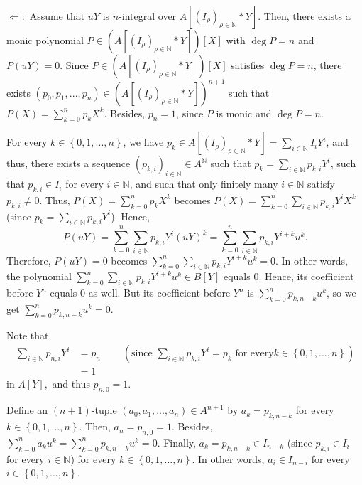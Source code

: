 \documentclass[12pt,final,notitlepage,onecolumn]{article}%
\begin{document}
$\Longleftarrow:$ Assume that $uY$ is $n$-integral over $A\left[  \left(
I_{\rho}\right)  _{\rho\in\mathbb{N}}\ast Y\right]  $. Then, there exists a
monic polynomial $P\in\left(  A\left[  \left(  I_{\rho}\right)  _{\rho
\in\mathbb{N}}\ast Y\right]  \right)  \left[  X\right]  $ with $\deg P=n$ and
$P\left(  uY\right)  =0$. Since $P\in\left(  A\left[  \left(  I_{\rho}\right)
_{\rho\in\mathbb{N}}\ast Y\right]  \right)  \left[  X\right]  $ satisfies
$\deg P=n$, there exists $\left(  p_{0},p_{1},...,p_{n}\right)  \in\left(
A\left[  \left(  I_{\rho}\right)  _{\rho\in\mathbb{N}}\ast Y\right]  \right)
^{n+1}$ such that $P\left(  X\right)  =\sum\limits_{k=0}^{n}p_{k}X^{k}$.
Besides, $p_{n}=1$, since $P$ is monic and $\deg P=n$.

For every $k\in\left\{  0,1,...,n\right\}  $, we have $p_{k}\in A\left[
\left(  I_{\rho}\right)  _{\rho\in\mathbb{N}}\ast Y\right]  =\sum
\limits_{i\in\mathbb{N}}I_{i}Y^{i}$, and thus, there exists a sequence
$\left(  p_{k,i}\right)  _{i\in\mathbb{N}}\in A^{\mathbb{N}}$ such that
$p_{k}=\sum\limits_{i\in\mathbb{N}}p_{k,i}Y^{i}$, such that $p_{k,i}\in I_{i}$
for every $i\in\mathbb{N}$, and such that only finitely many $i\in\mathbb{N}$
satisfy $p_{k,i}\neq0$. Thus, $P\left(  X\right)  =\sum\limits_{k=0}^{n}%
p_{k}X^{k}$ becomes $P\left(  X\right)  =\sum\limits_{k=0}^{n}\sum
\limits_{i\in\mathbb{N}}p_{k,i}Y^{i}X^{k}$ (since $p_{k}=\sum\limits_{i\in
\mathbb{N}}p_{k,i}Y^{i}$). Hence,
\[
P\left(  uY\right)  =\sum\limits_{k=0}^{n}\sum\limits_{i\in\mathbb{N}}%
p_{k,i}Y^{i}\left(  uY\right)  ^{k}=\sum\limits_{k=0}^{n}\sum\limits_{i\in
\mathbb{N}}p_{k,i}Y^{i+k}u^{k}.
\]
Therefore, $P\left(  uY\right)  =0$ becomes $\sum\limits_{k=0}^{n}%
\sum\limits_{i\in\mathbb{N}}p_{k,i}Y^{i+k}u^{k}=0$. In other words, the
polynomial $\sum\limits_{k=0}^{n}\sum\limits_{i\in\mathbb{N}}p_{k,i}%
Y^{i+k}u^{k}\in B\left[  Y\right]  $ equals $0$. Hence, its coefficient before
$Y^{n}$ equals $0$ as well. But its coefficient before $Y^{n}$ is
$\sum\limits_{k=0}^{n}p_{k,n-k}u^{k}$, so we get $\sum\limits_{k=0}%
^{n}p_{k,n-k}u^{k}=0$.

Note that%
\begin{align*}
\sum\limits_{i\in\mathbb{N}}p_{n,i}Y^{i}  &  =p_{n}\ \ \ \ \ \ \ \ \ \ \left(
\text{since }\sum\limits_{i\in\mathbb{N}}p_{k,i}Y^{i}=p_{k}\text{ for every
}k\in\left\{  0,1,...,n\right\}  \right) \\
&  =1
\end{align*}
in $A\left[  Y\right]  ,$ and thus $p_{n,0}=1$.

Define an $\left(  n+1\right)  $-tuple $\left(  a_{0},a_{1},...,a_{n}\right)
\in A^{n+1}$ by $a_{k}=p_{k,n-k}$ for every $k\in\left\{  0,1,...,n\right\}
.$ Then, $a_{n}=p_{n,0}=1$. Besides, $\sum\limits_{k=0}^{n}a_{k}u^{k}%
=\sum\limits_{k=0}^{n}p_{k,n-k}u^{k}=0$. Finally, $a_{k}=p_{k,n-k}\in I_{n-k}$
(since $p_{k,i}\in I_{i}$ for every $i\in\mathbb{N}$) for every $k\in\left\{
0,1,...,n\right\}  $. In other words, $a_{i}\in I_{n-i}$ for every
$i\in\left\{  0,1,...,n\right\}  $.
\end{document}
